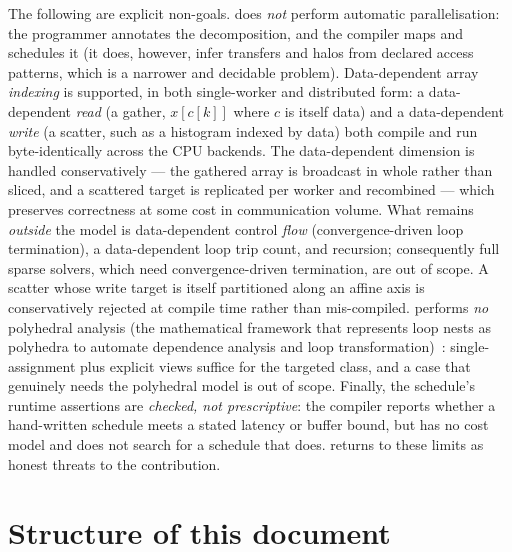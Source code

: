 The following are explicit non-goals. \nuc{} does \emph{not} perform automatic
parallelisation: the programmer annotates the decomposition, and the compiler
maps and schedules it (it does, however, infer transfers and halos from declared
access patterns, which is a narrower and decidable problem). Data-dependent array
\emph{indexing} is supported, in both single-worker and distributed form: a
data-dependent \emph{read} (a gather, $x[c[k]]$ where $c$ is itself data) and a
data-dependent \emph{write} (a scatter, such as a histogram indexed by data) both
compile and run byte-identically across the CPU backends. The data-dependent
dimension is handled conservatively --- the gathered array is broadcast in whole
rather than sliced, and a scattered target is replicated per worker and
recombined --- which preserves correctness at some cost in communication volume.
What remains \emph{outside} the model is data-dependent control \emph{flow}
(convergence-driven loop termination), a data-dependent loop trip count, and
recursion; consequently full sparse solvers, which need convergence-driven
termination, are out of scope. A scatter whose write target is itself partitioned
along an affine axis is conservatively rejected at compile time rather than
mis-compiled. \nuc{} performs \emph{no} polyhedral analysis (the mathematical
framework that represents loop nests as polyhedra to automate dependence analysis
and loop transformation)~\cite{verdoolaege2010isl}: single-assignment plus
explicit views suffice for the targeted class, and a case that genuinely needs
the polyhedral model is out of scope. Finally, the schedule's runtime assertions
are \emph{checked, not prescriptive}: the compiler reports whether a
hand-written schedule meets a stated latency or buffer bound, but has no cost
model and does not search for a schedule that does.  returns
to these limits as honest threats to the contribution.

\section{Structure of this document}\label{sec:intro-structure}

